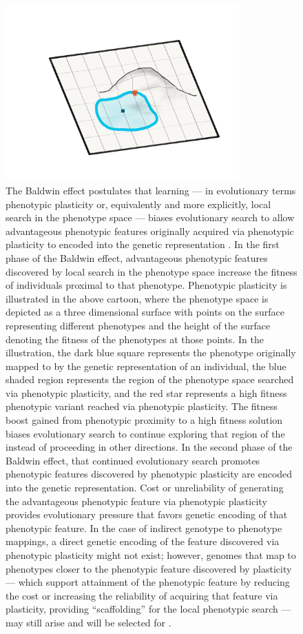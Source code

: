 \begin{figure}
  \label{fig:indirect_bias}
\end{figure}

\begin{figure}
  \includegraphics[width=0.8\textwidth]{img/baldwin_effect.png}
  \captionsetup{singlelinecheck=off,justification=raggedright}
  \caption{The Baldwin effect postulates that learning --- in evolutionary terms phenotypic plasticity or, equivalently and more explicitly, local search in the phenotype space --- biases evolutionary search to allow advantageous phenotypic features originally acquired via phenotypic plasticity to encoded into the genetic representation \cite{Downing2010TheNetworks}. In the first phase of the Baldwin effect, advantageous phenotypic features discovered by local search in the phenotype space increase the fitness of individuals proximal to that phenotype. Phenotypic plasticity is illustrated in the above cartoon, where the phenotype space is depicted as a three dimensional surface with points on the surface representing different phenotypes and the height of the surface denoting the fitness of the phenotypes at those points. In the illustration, the dark blue square represents the phenotype originally mapped to by the genetic representation of an individual, the blue shaded region represents the region of the phenotype space searched via phenotypic plasticity, and the red star represents a high fitness phenotypic variant reached via phenotypic plasticity. The fitness boost gained from phenotypic proximity to a high fitness solution biases evolutionary search to continue exploring that region of the instead of proceeding in other directions. In the second phase of the Baldwin effect, that continued evolutionary search promotes phenotypic features discovered by phenotypic plasticity are encoded into the genetic representation. Cost or unreliability of generating the advantageous phenotypic feature via phenotypic plasticity provides evolutionary pressure that favors genetic encoding of that phenotypic feature. In the case of indirect genotype to phenotype mappings, a direct genetic encoding of the feature discovered via phenotypic plasticity might not exist; however, genomes that map to phenotypes closer to the phenotypic feature discovered by plasticity --- which support attainment of the phenotypic feature by reducing the cost or increasing the reliability of acquiring that feature via plasticity, providing ``scaffolding'' for the local phenotypic search --- may still arise and will be selected for \cite{DowningHeterochronousBaldwinism}.}

\end{figure}
